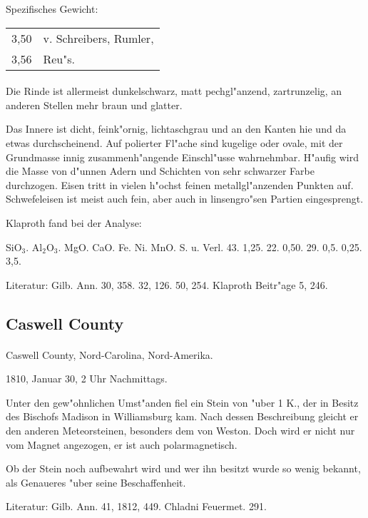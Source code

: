 \documentclass[a4paper, 11pt, oneside]{article}
\begin{document}
Spezifisches Gewicht:
\begin{table}[!ht]
    \centering
    \begin{tabular}{l l}
        3,50 & v. Schreibers, Rumler,\\
        3,56 & Reu"s.
    \end{tabular}
\end{table}
\paragraph{}
Die Rinde ist allermeist dunkelschwarz, matt pechgl"anzend, zartrunzelig, an anderen Stellen mehr braun und glatter.

Das Innere ist dicht, feink"ornig, lichtaschgrau und an den Kanten hie und da etwas durchscheinend. Auf polierter Fl"ache sind kugelige oder ovale, mit der Grundmasse innig zusammenh"angende Einschl"usse wahrnehmbar. H"aufig wird die Masse von d"unnen Adern und Schichten von sehr schwarzer Farbe durchzogen. Eisen tritt in vielen h"ochst feinen metallgl"anzenden Punkten auf. Schwefeleisen ist meist auch fein, aber auch in linsengro"sen Partien eingesprengt.

Klaproth fand bei der Analyse:

SiO$_{3}$. Al$_{2}$O$_{3}$. MgO. CaO. Fe. Ni. MnO. S. u. Verl.  
43. 1,25. 22. 0,50. 29. 0,5. 0,25. 3,5.

Literatur: Gilb. Ann. 30, 358. 32, 126. 50, 254. Klaproth Beitr"age 5, 246.

\subsection{Caswell County}
\normalsize
\paragraph{}
Caswell County, Nord-Carolina, Nord-Amerika.

1810, Januar 30, 2 Uhr Nachmittags.

Unter den gew"ohnlichen Umst"anden fiel ein Stein von "uber 1 K., der in Besitz des Bischofs Madison in Williamsburg kam. Nach dessen Beschreibung gleicht er den anderen Meteorsteinen, besonders dem von Weston. Doch wird er nicht nur vom Magnet angezogen, er ist auch polarmagnetisch.

Ob der Stein noch aufbewahrt wird und wer ihn besitzt wurde so wenig bekannt, als Genaueres "uber seine Beschaffenheit.

Literatur: Gilb. Ann. 41, 1812, 449. Chladni Feuermet. 291.
\end{document}
